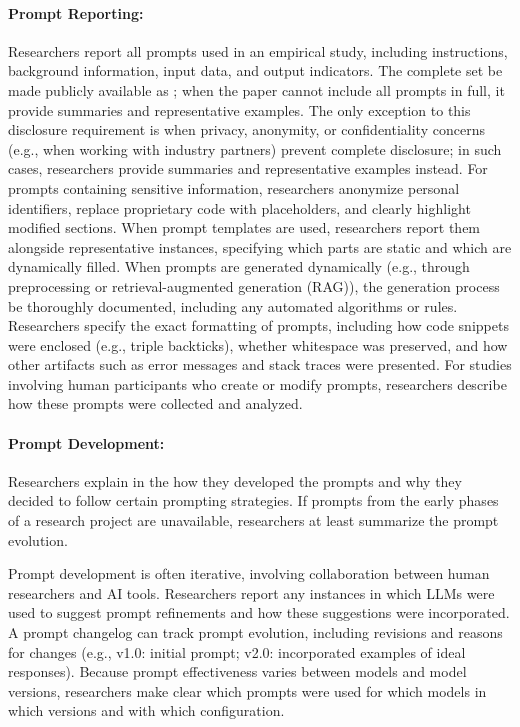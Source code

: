 \paragraph{Prompt Reporting:}
Researchers \must report all prompts used in an empirical study, including instructions, background information, input data, and output indicators.
The complete set \must be made publicly available as \supplementarymaterial; when the paper cannot include all prompts in full, it \should provide summaries and representative examples.
The only exception to this disclosure requirement is when privacy, anonymity, or confidentiality concerns (e.g., when working with industry partners) prevent complete disclosure; in such cases, researchers \should provide summaries and representative examples instead.
For prompts containing sensitive information, researchers \must anonymize personal identifiers, replace proprietary code with placeholders, and clearly highlight modified sections.
When prompt templates are used, researchers \must report them alongside representative instances, specifying which parts are static and which are dynamically filled.
When prompts are generated dynamically (e.g., through preprocessing or retrieval-augmented generation (RAG)), the generation process \must be thoroughly documented, including any automated algorithms or rules.
Researchers \should specify the exact formatting of prompts, including how code snippets were enclosed (e.g., triple backticks), whether whitespace was preserved, and how other artifacts such as error messages and stack traces were presented.
For studies involving human participants who create or modify prompts, researchers \should describe how these prompts were collected and analyzed.

\paragraph{Prompt Development:}
Researchers \should explain in the \paper how they developed the prompts and why they decided to follow certain prompting strategies.
If prompts from the early phases of a research project are unavailable, researchers \should at least summarize the prompt evolution.

Prompt development is often iterative, involving collaboration between human researchers and AI tools.
Researchers \should report any instances in which LLMs were used to suggest prompt refinements and how these suggestions were incorporated.
A prompt changelog can track prompt evolution, including revisions and reasons for changes (e.g., v1.0: initial prompt; v2.0: incorporated examples of ideal responses).
Because prompt effectiveness varies between models and model versions, researchers \must make clear which prompts were used for which models in which versions and with which configuration.


